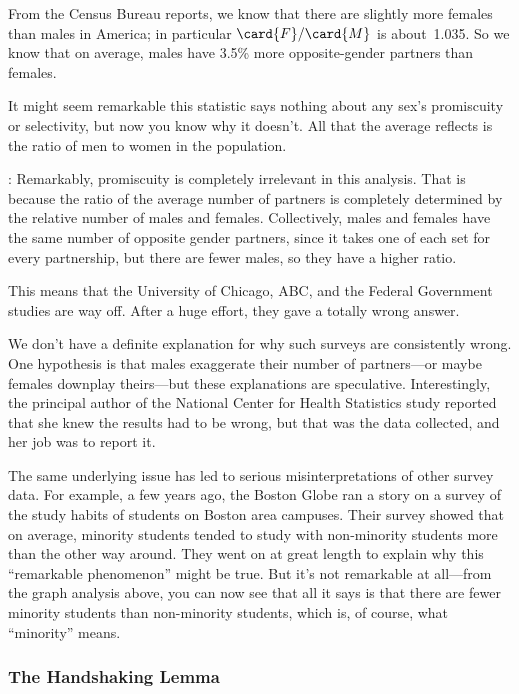 From the Census Bureau reports, we know that there are slightly more
females than males in America; in particular $\card{F} / \card{M}$ is
about~1.035.  So we know that on average, males have 3.5\% more
opposite-gender partners than females.
\begin{editingnotes}
\end{editingnotes} It might seem
remarkable this statistic says nothing about any sex's promiscuity or
selectivity, but now you know why it doesn't.  All that the average
reflects is the ratio of men to women in the population.
\begin{editingnotes}
: Remarkably, promiscuity is completely irrelevant in this
  analysis.  That is because the ratio of the average number of
  partners is completely determined by the relative number of males
  and females.  Collectively, males and females have the same number
  of opposite gender partners, since it takes one of each set for
  every partnership, but there are fewer males, so they have a higher
  ratio.
\end{editingnotes}
This means that the University of Chicago, ABC, and the Federal
Government studies are way off.  After a huge effort, they gave a
totally wrong answer.

We don't have a definite explanation for why such surveys are consistently
wrong.  One hypothesis is that males exaggerate their number of
partners---or maybe females downplay theirs---but these explanations are
speculative.  Interestingly, the principal author of the National Center
for Health Statistics study reported that she knew the results had to be
wrong, but that was the data collected, and her job was to report it.

The same underlying issue has led to serious misinterpretations of other
survey data.  For example, a few years ago, the Boston Globe ran a story
on a survey of the study habits of students on Boston area campuses.
Their survey showed that on average, minority students tended to study
with non-minority students more than the other way around.  They went on
at great length to explain why this ``remarkable phenomenon'' might be
true.  But it's not remarkable at all---from the graph analysis above, you
can now see that all it says is that there are fewer minority students
than non-minority students, which is, of course, what ``minority'' means.

\subsubsection{The Handshaking Lemma}


